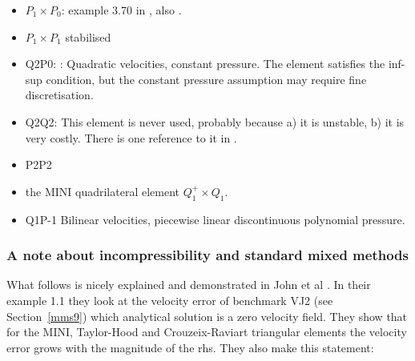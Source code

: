 \begin{itemize}
\item $P_1\times P_0$: example 3.70 in \cite{john16}, also \cite{john98}. 
\item $P_1\times P_1$ stabilised \cite{nosi98,tasu00}
\item Q2P0: : 
Quadratic velocities, constant pressure. The element satisfies the inf-sup condition, but the constant pressure assumption may require fine discretisation.

\item Q2Q2: This element is never used, probably because a) it is unstable, b) it is very costly. 
There is one reference to it in \cite{hufb86}.
\item P2P2
\item the MINI quadrilateral element $Q_1^+\times Q_1$.  \cite{bai97,kwpa14}
\item Q1P-1 Bilinear velocities,  piecewise linear discontinuous polynomial pressure.
\end{itemize}

\subsubsection{A note about incompressibility and standard mixed methods}

What follows is nicely explained and demonstrated in John et al \cite{jolm17}. In their 
example 1.1 they look at the velocity error of benchmark VJ2 (see Section~\ref{mms9}) 
which analytical solution is a zero velocity field. They show that for the MINI, 
Taylor-Hood and Crouzeix-Raviart triangular elements the velocity error grows 
with the magnitude of the rhs. They also make this statement:




